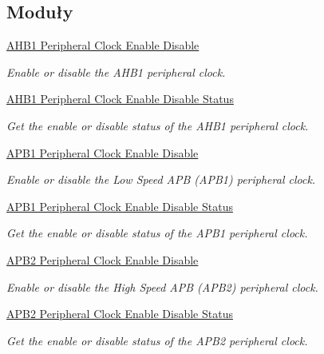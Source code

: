 \subsection*{Moduły}
\begin{DoxyCompactItemize}
\item 
\hyperlink{group___r_c_c___a_h_b1___clock___enable___disable}{A\+H\+B1 Peripheral Clock Enable Disable}
\begin{DoxyCompactList}\small\item\em Enable or disable the A\+H\+B1 peripheral clock. \end{DoxyCompactList}\item 
\hyperlink{group___r_c_c___a_h_b1___peripheral___clock___enable___disable___status}{A\+H\+B1 Peripheral Clock Enable Disable Status}
\begin{DoxyCompactList}\small\item\em Get the enable or disable status of the A\+H\+B1 peripheral clock. \end{DoxyCompactList}\item 
\hyperlink{group___r_c_c___a_p_b1___clock___enable___disable}{A\+P\+B1 Peripheral Clock Enable Disable}
\begin{DoxyCompactList}\small\item\em Enable or disable the Low Speed A\+PB (A\+P\+B1) peripheral clock. \end{DoxyCompactList}\item 
\hyperlink{group___r_c_c___a_p_b1___peripheral___clock___enable___disable___status}{A\+P\+B1 Peripheral Clock Enable Disable Status}
\begin{DoxyCompactList}\small\item\em Get the enable or disable status of the A\+P\+B1 peripheral clock. \end{DoxyCompactList}\item 
\hyperlink{group___r_c_c___a_p_b2___clock___enable___disable}{A\+P\+B2 Peripheral Clock Enable Disable}
\begin{DoxyCompactList}\small\item\em Enable or disable the High Speed A\+PB (A\+P\+B2) peripheral clock. \end{DoxyCompactList}\item 
\hyperlink{group___r_c_c___a_p_b2___peripheral___clock___enable___disable___status}{A\+P\+B2 Peripheral Clock Enable Disable Status}
\begin{DoxyCompactList}\small\item\em Get the enable or disable status of the A\+P\+B2 peripheral clock. \end{DoxyCompactList}\item 

\end{DoxyCompactItemize}
